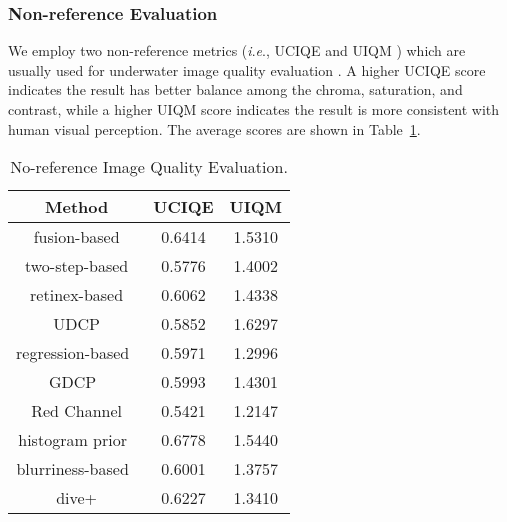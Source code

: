 \documentclass[journal]{IEEEtran}
\newcommand{\ie}{\textit{i}.\textit{e}.}
\begin{document}
\subsubsection{Non-reference Evaluation}

We employ two non-reference metrics (\ie, UCIQE \cite{Yang2015} and UIQM \cite{Panetta2016}) which are usually used for underwater image quality evaluation \cite{Li2017prl,Li2016,Peng2017,Peng2018}.
A higher UCIQE score indicates the result has better balance among the chroma, saturation, and contrast, while a higher UIQM score indicates the result is more consistent with human visual perception. The average scores are shown in Table~\ref{table_3}.



\begin{table}[htbp]
\caption{No-reference Image Quality Evaluation.}
 \centering
\begin{tabular}{c|c|c}
  \hline
  \textbf{Method}  & \textbf{UCIQE \cite{Yang2015}}  &  \textbf{UIQM \cite{Panetta2016}} \\
  \hline
  fusion-based \cite{Ancuti2012} &  \textcolor[rgb]{0.00,0.07,1.00}{0.6414} & 1.5310\\
  two-step-based \cite{Fu2017}  &0.5776 & 1.4002\\
  retinex-based \cite{Fu2014}  &0.6062 & 1.4338\\
  UDCP \cite{Drews2016}  &0.5852 & {\color{red}1.6297}\\
  regression-based~\cite{Li2017prl}  &0.5971 & 1.2996\\
  GDCP~\cite{Peng2018}  & 0.5993 & 1.4301\\
  Red Channel \cite{Galdran2015}  & 0.5421& 1.2147 \\
  histogram prior~\cite{Li2016}  & \textcolor[rgb]{1.00,0.00,0.00}{0.6778} & \textcolor[rgb]{0.00,0.07,1.00}{1.5440}\\
  blurriness-based~\cite{Peng2017}  &0.6001 &1.3757\\
  dive+ &   0.6227& 1.3410\\
  \hline
\end{tabular}
\vspace{\baselineskip}
\label{table_3}
\end{table}
\end{document}
